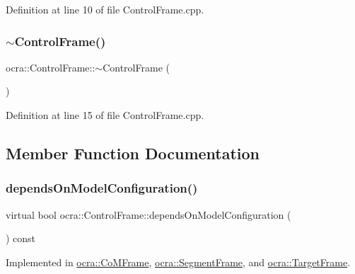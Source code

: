 Definition at line 10 of file Control\+Frame.\+cpp.

\hypertarget{classocra_1_1ControlFrame_abfbbf55462bf1b256f12316ae3abe357}{}\label{classocra_1_1ControlFrame_abfbbf55462bf1b256f12316ae3abe357} 
\subsubsection{\texorpdfstring{$\sim$\+Control\+Frame()}{~ControlFrame()}}
{\footnotesize\ttfamily ocra\+::\+Control\+Frame\+::$\sim$\+Control\+Frame (\begin{DoxyParamCaption}{ }\end{DoxyParamCaption})\hspace{0.3cm}{\ttfamily [pure virtual]}}



Definition at line 15 of file Control\+Frame.\+cpp.



\subsection{Member Function Documentation}
\hypertarget{classocra_1_1ControlFrame_a65833d1f3f42bc8d452f8b1fb671e142}{}\label{classocra_1_1ControlFrame_a65833d1f3f42bc8d452f8b1fb671e142} 
\subsubsection{\texorpdfstring{depends\+On\+Model\+Configuration()}{dependsOnModelConfiguration()}}
{\footnotesize\ttfamily virtual bool ocra\+::\+Control\+Frame\+::depends\+On\+Model\+Configuration (\begin{DoxyParamCaption}{ }\end{DoxyParamCaption}) const\hspace{0.3cm}{\ttfamily [pure virtual]}}



Implemented in \hyperlink{classocra_1_1CoMFrame_aaae3fd05da2f9e301dbe1c54b57fe624}{ocra\+::\+Co\+M\+Frame}, \hyperlink{classocra_1_1SegmentFrame_a68708b5ced24d192fbb0bfd9e3647925}{ocra\+::\+Segment\+Frame}, and \hyperlink{classocra_1_1TargetFrame_ab4512f64463c359090ffdbead9a9e349}{ocra\+::\+Target\+Frame}.


